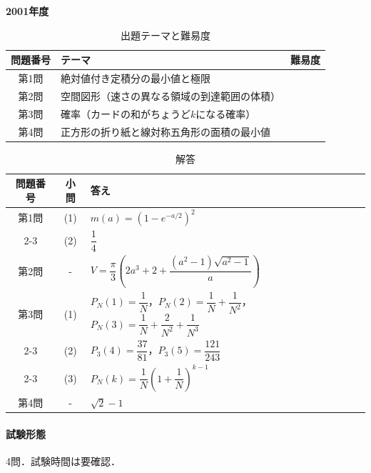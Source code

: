\documentclass[../../main.tex]{subfiles}
\begin{document}
\begin{center}
  {\fontsize{48pt}{58pt}\selectfont \textbf{2001}\normalsize\textbf{年度}}
\end{center}

\begin{table}[htb]
  \centering
  \caption{出題テーマと難易度}
  \begin{tabular}{|c|p{9cm}|c|}
    \hline
    \textbf{問題番号} & \textbf{テーマ} & \textbf{難易度} \\
    \hline
    第1問 & 絶対値付き定積分の最小値と極限 & \\
    \hline
    第2問 & 空間図形（速さの異なる領域の到達範囲の体積） & \\
    \hline
    第3問 & 確率（カードの和がちょうど$k$になる確率） & \\
    \hline
    第4問 & 正方形の折り紙と線対称五角形の面積の最小値 & \\
    \hline
  \end{tabular}
\end{table}

\begin{table}[htb]
  \centering
  \caption{解答}
  \renewcommand{\arraystretch}{1.4}
  \begin{tabular}{|c|c|p{9cm}|}
    \hline
    \textbf{問題番号} & \textbf{小問} & \textbf{答え} \\
    \hline
    第1問 & (1) & $m(a)=\left(1-e^{-a/2}\right)^2$ \\
    \cline{2-3}
    & (2) & $\dfrac{1}{4}$ \\
    \hline
    第2問 & - & $V=\dfrac{\pi}{3}\left(2a^3+2+\dfrac{(a^2-1)\sqrt{a^2-1}}{a}\right)$ \\
    \hline
    第3問 & (1) & $P_N(1)=\dfrac{1}{N}$，$P_N(2)=\dfrac{1}{N}+\dfrac{1}{N^2}$，$P_N(3)=\dfrac{1}{N}+\dfrac{2}{N^2}+\dfrac{1}{N^3}$ \\
    \cline{2-3}
    & (2) & $P_3(4)=\dfrac{37}{81}$，$P_3(5)=\dfrac{121}{243}$ \\
    \cline{2-3}
    & (3) & $P_N(k)=\dfrac{1}{N}\left(1+\dfrac{1}{N}\right)^{k-1}$ \\
    \hline
    第4問 & - & $\sqrt{2}-1$ \\
    \hline
  \end{tabular}
\end{table}

\paragraph{試験形態}
4問．試験時間は要確認．
\end{document}
